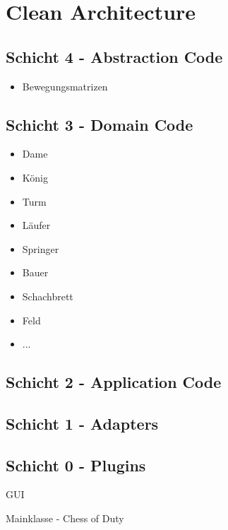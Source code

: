 \chapter{Clean Architecture}

\section*{Schicht 4 - Abstraction Code}

\begin{itemize}
    \item Bewegungsmatrizen
\end{itemize}

\section*{Schicht 3 - Domain Code}

\begin{itemize}
    \item Dame
    \item König
    \item Turm
    \item Läufer
    \item Springer
    \item Bauer
    \item Schachbrett
    \item Feld
    \item ...
\end{itemize}

\section*{Schicht 2 - Application Code}

\section*{Schicht 1 - Adapters}

\section*{Schicht 0 - Plugins}

GUI


Mainklasse - Chess of Duty